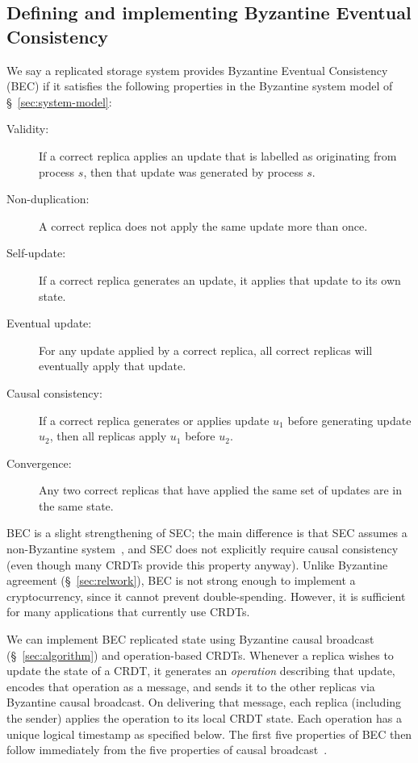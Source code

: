 \documentclass[a4paper,anonymous,USenglish]{lipics-v2019}
\begin{document}
\subsection{Defining and implementing Byzantine Eventual Consistency}

We say a replicated storage system provides Byzantine Eventual Consistency (BEC) if it satisfies the following properties in the Byzantine system model of \S~\ref{sec:system-model}:

\begin{description}
\item[Validity:] If a correct replica applies an update that is labelled as originating from process $s$, then that update was generated by process $s$.
\item[Non-duplication:] A correct replica does not apply the same update more than once.
\item[Self-update:] If a correct replica generates an update, it applies that update to its own state.
\item[Eventual update:] For any update applied by a correct replica, all correct replicas will eventually apply that update.
\item[Causal consistency:] If a correct replica generates or applies update $u_1$ before generating update $u_2$, then all replicas apply $u_1$ before $u_2$.
\item[Convergence:] Any two correct replicas that have applied the same set of updates are in the same state.
\end{description}

BEC is a slight strengthening of SEC; the main difference is that SEC assumes a non-Byzantine system~\cite{Shapiro:2011}, and SEC does not explicitly require causal consistency (even though many CRDTs provide this property anyway).
Unlike Byzantine agreement (\S~\ref{sec:relwork}), BEC is not strong enough to implement a cryptocurrency, since it cannot prevent double-spending.
However, it is sufficient for many applications that currently use CRDTs.

We can implement BEC replicated state using Byzantine causal broadcast (\S~\ref{sec:algorithm}) and operation-based CRDTs.
Whenever a replica wishes to update the state of a CRDT, it generates an \emph{operation} describing that update, encodes that operation as a message, and sends it to the other replicas via Byzantine causal broadcast.
On delivering that message, each replica (including the sender) applies the operation to its local CRDT state.
Each operation has a unique logical timestamp as specified below.
The first five properties of BEC then follow immediately from the five properties of causal broadcast~\cite{Gomes:2017gy}.
\end{document}
